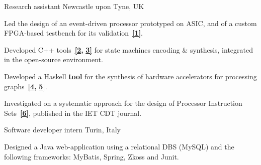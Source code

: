 \begin{cventries}
\cventry
{}
{\vspace{-9mm}Research assistant } %
{\vspace{-9mm}Newcastle upon Tyne, UK} %
{}
{	
\begin{cvitems}
\item {Led the design of an event-driven processor prototyped on 
ASIC, and of a custom FPGA-based testbench for its
validation~{\color{myblue}\href{https://github.com/tuura/papers/tree/master/date-2018}{\textbf{[1]}}}.}
\item {Developed C++
tools~{\color{myblue}\href{https://github.com/tuura/shutters}{\textbf{[2}}}{\color{myblue}\textbf{,}}
{\color{myblue}\href{https://github.com/tuura/scenco}{\textbf{3]}}}
for state machines encoding \& synthesis, integrated in the open-source
\href{https://workcraft.org/}{} 
environment.}
\item {Developed a Haskell 
{\color{myblue}\href{https://github.com/tuura/fantasi/tree/master/doc}{\textbf{tool}}}
for the synthesis of hardware accelerators for processing 
graphs~{\color{myblue}\href{https://youtu.be/Z2w0hiHY3Us}{\textbf{[4}}}{\color{myblue}\textbf{,}}
{\color{myblue}\href{https://poets-project.org/publications}{\textbf{5]}}}.}
\item {Investigated on a systematic approach for the design of Processor 
Instruction 
Sets~{\color{myblue}\href{https://eprint.ncl.ac.uk/file_store/production/251075/92600BF7-92A0-4B22-897A-01892DDA9E2F.pdf}{\textbf{[6]}}},
 published in the IET CDT journal.}
\end{cvitems}
}
\vspace{-5mm}

\cventry
{}%
{\vspace{-9mm}Software developer intern }
{\vspace{-9mm}Turin, Italy}
{}
{
\begin{cvitems}
Designed a Java web-application using a relational DBS (MySQL) and the 
following frameworks: MyBatis, Spring, Zkoss and Junit.
\end{cvitems}
}


\end{cventries}
\vspace{-3mm}